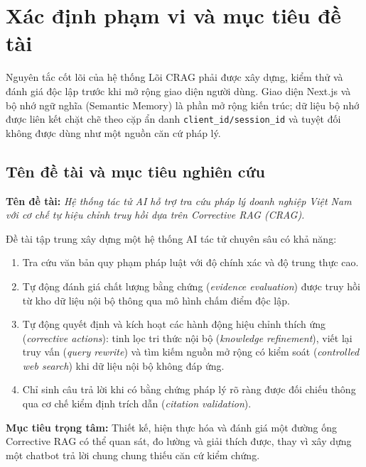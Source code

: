 \chapter{Xác định phạm vi và mục tiêu đề tài}

\begin{calloutbox}{Nguyên tắc cốt lõi của hệ thống}
Lõi CRAG phải được xây dựng, kiểm thử và đánh giá độc lập trước khi mở rộng giao diện người dùng. Giao diện Next.js và bộ nhớ ngữ nghĩa (Semantic Memory) là phần mở rộng kiến trúc; dữ liệu bộ nhớ được liên kết chặt chẽ theo cặp ẩn danh \texttt{client\_id/session\_id} và tuyệt đối không được dùng như một nguồn căn cứ pháp lý.
\end{calloutbox}

\section{Tên đề tài và mục tiêu nghiên cứu}

\noindent\textbf{Tên đề tài:} \textit{Hệ thống tác tử AI hỗ trợ tra cứu pháp lý doanh nghiệp Việt Nam với cơ chế tự hiệu chỉnh truy hồi dựa trên Corrective RAG (CRAG).}

\vspace{0.3cm}
Đề tài tập trung xây dựng một hệ thống AI tác tử chuyên sâu có khả năng:
\begin{enumerate}
    \item Tra cứu văn bản quy phạm pháp luật với độ chính xác và độ trung thực cao.
    \item Tự động đánh giá chất lượng bằng chứng (\textit{evidence evaluation}) được truy hồi từ kho dữ liệu nội bộ thông qua mô hình chấm điểm độc lập.
    \item Tự động quyết định và kích hoạt các hành động hiệu chỉnh thích ứng (\textit{corrective actions}): tinh lọc tri thức nội bộ (\textit{knowledge refinement}), viết lại truy vấn (\textit{query rewrite}) và tìm kiếm nguồn mở rộng có kiểm soát (\textit{controlled web search}) khi dữ liệu nội bộ không đáp ứng.
    \item Chỉ sinh câu trả lời khi có bằng chứng pháp lý rõ ràng được đối chiếu thông qua cơ chế kiểm định trích dẫn (\textit{citation validation}).
\end{enumerate}

\begin{keypoint}
\textbf{Mục tiêu trọng tâm:} Thiết kế, hiện thực hóa và đánh giá một đường ống Corrective RAG có thể quan sát, đo lường và giải thích được, thay vì xây dựng một chatbot trả lời chung chung thiếu căn cứ kiểm chứng.
\end{keypoint}

